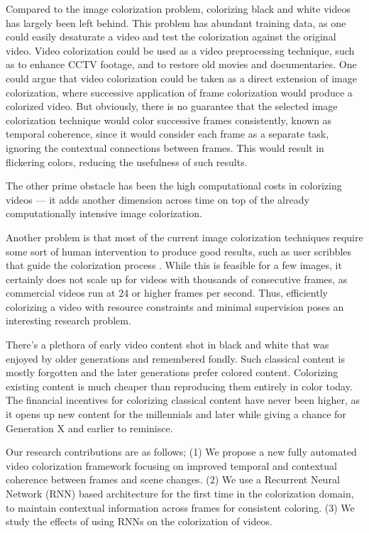 \documentclass[10pt,twocolumn,letterpaper]{article}
\begin{document}
Compared to the image colorization problem, colorizing black and white videos has largely been left behind. This problem has abundant training data, as one could easily desaturate a video and test the colorization against the original video. Video colorization could be used as a video preprocessing technique, such as to enhance CCTV footage, and to restore old movies and documentaries. One could argue that video colorization could be taken as a direct extension of image colorization, where successive application of frame colorization would produce a colorized video. But obviously, there is no guarantee that the selected image colorization technique would color successive frames consistently, known as temporal coherence, since it would consider each frame as a separate task, ignoring the contextual connections between frames.  This would result in flickering colors, reducing the usefulness of such results.

\raggedbottom
The other prime obstacle has been the high computational costs in colorizing videos \cite{Levin:2004:CUO:1015706.1015780,6575125} --– it adds another dimension across time on top of the already computationally intensive image colorization.

Another problem is that most of the current image colorization techniques require some sort of human intervention to produce good results, such as user scribbles that guide the colorization process \cite{Levin:2004:CUO:1015706.1015780, DBLP:journals/corr/ZhangZIGLYE17}. While this is feasible for a few images, it certainly does not scale up for videos with thousands of consecutive frames, as commercial videos run at 24 or higher frames per second. Thus, efficiently colorizing a video with resource constraints and minimal supervision poses an interesting research problem.

There's a plethora of early video content shot in black and white that was enjoyed by older generations and remembered fondly. Such classical content is mostly forgotten and the later generations prefer colored content. Colorizing existing content is much cheaper than reproducing them entirely in color today. The financial incentives for colorizing classical content have never been higher, as it opens up new content for the millennials and later while giving a chance for Generation X and earlier to reminisce.

Our research contributions are as follows; (1) We propose a new fully automated video colorization framework focusing on improved temporal and contextual coherence between frames and scene changes. (2) We use a Recurrent Neural Network (RNN) based architecture for the first time in the colorization domain, to maintain contextual information across frames for consistent coloring. (3) We study the effects of using RNNs on the colorization of videos.
\end{document}
